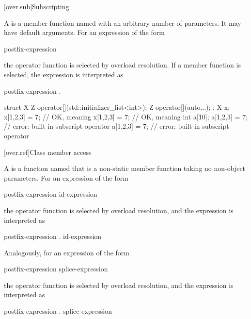 [over.sub]{Subscripting}%
%

\pnum
A 
is a member function named 
with an arbitrary number of parameters.
It may have default arguments.
For an expression of the form
\begin{ncsimplebnf}
postfix-expression \terminal{[}  \terminal{]}
\end{ncsimplebnf}
the operator function
is selected by overload resolution.
If a member function is selected,
the expression is interpreted as
\begin{ncsimplebnf}
postfix-expression .  \terminal{[}\terminal{]} \terminal{(}  \terminal{)}
\end{ncsimplebnf}

\pnum
\begin{example}
\begin{codeblock}
struct X {
  Z operator[](std::initializer_list<int>);
  Z operator[](auto...);
};
X x;
x[{1,2,3}] = 7;                 // OK, meaning 
x[1,2,3] = 7;                   // OK, meaning 
int a[10];
a[{1,2,3}] = 7;                 // error: built-in subscript operator
a[1,2,3] = 7;                   // error: built-in subscript operator
\end{codeblock}
\end{example}

[over.ref]{Class member access}
%

\pnum
A 
is a function named 
that is a non-static member function taking no non-object parameters.
For an expression of the form
\begin{ncsimplebnf}
postfix-expression \terminal{->}  id-expression
\end{ncsimplebnf}
the operator function
is selected by overload resolution,
and the expression is interpreted as
\begin{ncsimplebnf}
\terminal{(} postfix-expression .  \terminal{->} \terminal{(}\terminal{)} \terminal{)} \terminal{->}  id-expression
\end{ncsimplebnf}
Analogously, for an expression of the form
\begin{ncsimplebnf}
postfix-expression \terminal{->} splice-expression
\end{ncsimplebnf}
the operator function is selected by overload resolution,
and the expression is interpreted as
\begin{ncsimplebnf}
\terminal{(} postfix-expression .  \terminal{->} \terminal{(}\terminal{)} \terminal{)} \terminal{->} splice-expression
\end{ncsimplebnf}

